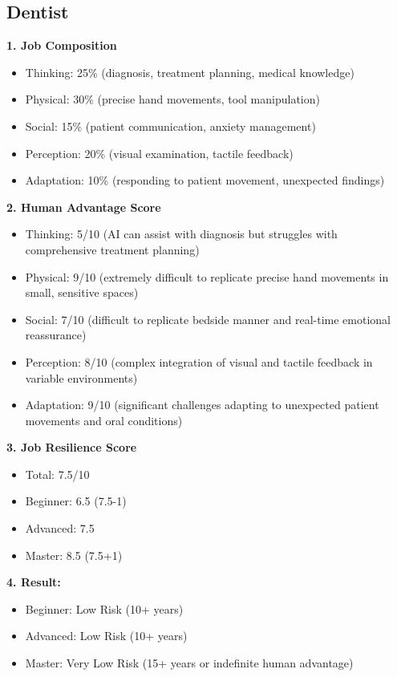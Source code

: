 \documentclass[
  11pt,
]{article}
\providecommand{\tightlist}{%
  \setlength{\itemsep}{0pt}\setlength{\parskip}{0pt}}
\begin{document}
\subsection{Dentist}\label{dentist}

\textbf{1. Job Composition}

\begin{itemize}
\tightlist
\item
  Thinking: 25\% (diagnosis, treatment planning, medical knowledge)
\item
  Physical: 30\% (precise hand movements, tool manipulation)
\item
  Social: 15\% (patient communication, anxiety management)
\item
  Perception: 20\% (visual examination, tactile feedback)
\item
  Adaptation: 10\% (responding to patient movement, unexpected findings)
\end{itemize}

\textbf{2. Human Advantage Score}

\begin{itemize}
\tightlist
\item
  Thinking: 5/10 (AI can assist with diagnosis but struggles with
  comprehensive treatment planning)
\item
  Physical: 9/10 (extremely difficult to replicate precise hand
  movements in small, sensitive spaces)
\item
  Social: 7/10 (difficult to replicate bedside manner and real-time
  emotional reassurance)
\item
  Perception: 8/10 (complex integration of visual and tactile feedback
  in variable environments)
\item
  Adaptation: 9/10 (significant challenges adapting to unexpected
  patient movements and oral conditions)
\end{itemize}

\textbf{3. Job Resilience Score}

\begin{itemize}
\tightlist
\item
  Total: 7.5/10
\item
  Beginner: 6.5 (7.5-1)
\item
  Advanced: 7.5
\item
  Master: 8.5 (7.5+1)
\end{itemize}

\textbf{4. Result:}

\begin{itemize}
\tightlist
\item
  Beginner: Low Risk (10+ years)
\item
  Advanced: Low Risk (10+ years)
\item
  Master: Very Low Risk (15+ years or indefinite human advantage)
\end{itemize}
\end{document}
